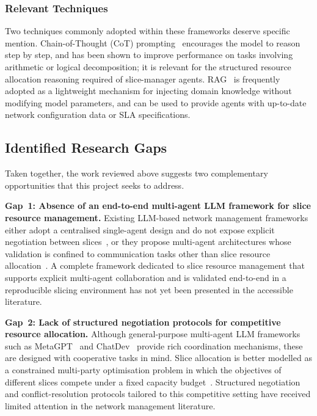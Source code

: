 \subsubsection{Relevant Techniques}

Two techniques commonly adopted within these frameworks deserve specific mention. Chain-of-Thought (CoT) prompting~\cite{wei2022cot} encourages the model to reason step by step, and has been shown to improve performance on tasks involving arithmetic or logical decomposition; it is relevant for the structured resource allocation reasoning required of slice-manager agents. RAG~\cite{lewis2020rag} is frequently adopted as a lightweight mechanism for injecting domain knowledge without modifying model parameters, and can be used to provide agents with up-to-date network configuration data or SLA specifications.

\subsection{Identified Research Gaps}

Taken together, the work reviewed above suggests two complementary opportunities that this project seeks to address.

\textbf{Gap~1: Absence of an end-to-end multi-agent LLM framework for slice resource management.} Existing LLM-based network management frameworks either adopt a centralised single-agent design and do not expose explicit negotiation between slices~\cite{tong2025wirelessagent,shao2024wirelessllm}, or they propose multi-agent architectures whose validation is confined to communication tasks other than slice resource allocation~\cite{jiang2024commllm}. A complete framework dedicated to slice resource management that supports explicit multi-agent collaboration and is validated end-to-end in a reproducible slicing environment has not yet been presented in the accessible literature.

\textbf{Gap~2: Lack of structured negotiation protocols for competitive resource allocation.} Although general-purpose multi-agent LLM frameworks such as MetaGPT~\cite{hong2023metagpt} and ChatDev~\cite{qian2023chatdev} provide rich coordination mechanisms, these are designed with cooperative tasks in mind. Slice allocation is better modelled as a constrained multi-party optimisation problem in which the objectives of different slices compete under a fixed capacity budget~\cite{caballero2019games}. Structured negotiation and conflict-resolution protocols tailored to this competitive setting have received limited attention in the network management literature.

